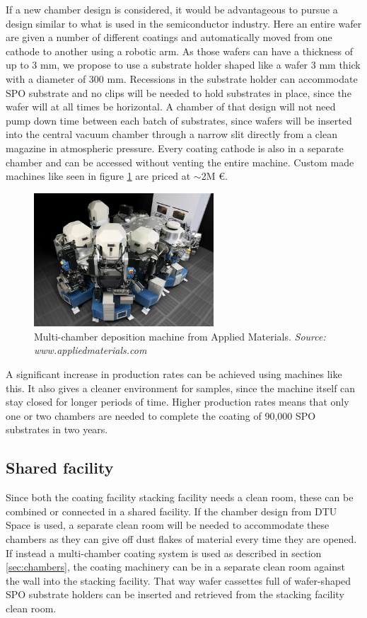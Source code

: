 If a new chamber design is considered, it would be advantageous to pursue a design similar to what is used in the semiconductor industry. Here an entire wafer are given a number of different coatings and automatically moved from one cathode to another using a robotic arm. As those wafers can have a thickness of up to 3 mm, we propose to use a substrate holder shaped like a wafer 3 mm thick with a diameter of 300 mm. Recessions in the substrate holder can accommodate SPO substrate and no clips will be needed to hold substrates in place, since the wafer will at all times be horizontal. A chamber of that design will not need pump down time between each batch of substrates, since wafers will be inserted into the central vacuum chamber through a narrow slit directly from a clean magazine in atmospheric pressure. Every coating cathode is also in a separate chamber and can be accessed without venting the entire machine. Custom made machines like seen in figure \ref{fig:dram} are priced at $\sim$2M \euro.

\begin{figure}[htbp]
	\centering
		\includegraphics[width=0.6\textwidth]{figures/athena/dram.jpeg}
	\caption{\footnotesize Multi-chamber deposition machine from Applied Materials. \emph{Source: www.appliedmaterials.com}}
	\label{fig:dram}
\end{figure}

A significant increase in production rates can be achieved using machines like this. It also gives a cleaner environment for samples, since the machine itself can stay closed for longer periods of time. Higher production rates means that only one or two chambers are needed to complete the coating of 90,000 SPO substrates in two years.

\subsection{Shared facility}
Since both the coating facility stacking facility needs a clean room, these can be combined or connected in a shared facility. If the chamber design from DTU Space is used, a separate clean room will be needed to accommodate these chambers as they can give off dust flakes of material every time they are opened. If instead a multi-chamber coating system is used as described in section \ref{sec:chambers}, the coating machinery can be in a separate clean room against the wall into the stacking facility. That way wafer cassettes full of wafer-shaped SPO substrate holders can be inserted and retrieved from the stacking facility clean room.

